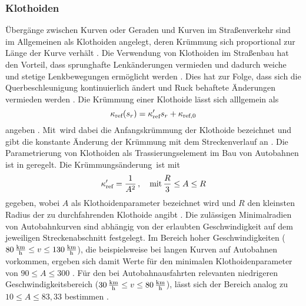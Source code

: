\subsubsection{Klothoiden}\label{subsubsec:Klothoiden}
Übergänge zwischen Kurven oder Geraden und Kurven im Straßenverkehr sind im Allgemeinen als Klothoiden angelegt, deren Krümmung sich proportional zur Länge der Kurve verhält \cite{ForschungsgesellschaftfurStraenundVerkehrswesen.2008}. Die Verwendung von Klothoiden im Straßenbau hat den Vorteil, dass sprunghafte Lenkänderungen vermieden und dadurch weiche und stetige Lenkbewegungen ermöglicht werden \cite{ForschungsgesellschaftfurStraenundVerkehrswesen.2008}. Dies hat zur Folge, dass sich die Querbeschleunigung kontinuierlich ändert und Ruck behaftete Änderungen vermieden werden \cite{ForschungsgesellschaftfurStraenundVerkehrswesen.2008}. Die Krümmung einer Klothoide lässt sich alllgemein als 
\begin{equation}
	\kappa_{\textrm{ref}}(s_r) = \kappa'_{\textrm{ref}} s_r + \kappa_{\textrm{ref},0}
\end{equation}
angeben \cite{Rathgeber.2016}. Mit \kapparefzero\,wird dabei die Anfangskrümmung der Klothoide bezeichnet und \dkapparef\,gibt die konstante Änderung der Krümmung mit dem Streckenverlauf an \cite{Rathgeber.2016}. Die Parametrierung von Klothoiden als Trassierungselement im Bau von Autobahnen ist in \cite{ForschungsgesellschaftfurStraenundVerkehrswesen.2008} geregelt. Die Krümmungsänderung \dkapparef\,ist mit 
\begin{equation}
	\kappa'_{\textrm{ref}} = \frac{1}{A^2}\,,\quad\textrm{mit}\, \frac{R}{3}\leq A\leq R
\end{equation}
gegeben, wobei $A$ als Klothoidenparameter bezeichnet wird und $R$ den kleinsten Radius der zu durchfahrenden Klothoide angibt \cite{ForschungsgesellschaftfurStraenundVerkehrswesen.2008}. Die zulässigen Minimalradien von Autobahnkurven sind abhängig von der erlaubten Geschwindigkeit auf dem jeweiligen Streckenabschnitt festgelegt. Im Bereich hoher Geschwindigkeiten ($80\,\mathrm{\frac{\mathrm{km}}{\mathrm{h}}}\leq v\leq 130\,\mathrm{\frac{\mathrm{km}}{\mathrm{h}}}$), die beispielsweise bei langen Kurven auf Autobahnen vorkommen, ergeben sich damit Werte für den minimalen Klothoidenparameter von $90\leq A\leq 300$ \cite{ForschungsgesellschaftfurStraenundVerkehrswesen.2008}. Für den bei Autobahnausfahrten relevanten niedrigeren Geschwindigkeitsbereich ($30\,\mathrm{\frac{\mathrm{km}}{\mathrm{h}}}\leq v\leq 80\,\mathrm{\frac{\mathrm{km}}{\mathrm{h}}}$), lässt sich der Bereich analog zu $10\leq A\leq 83,33$ bestimmen \cite{ForschungsgesellschaftfurStraenundVerkehrswesen.2008}.
 
